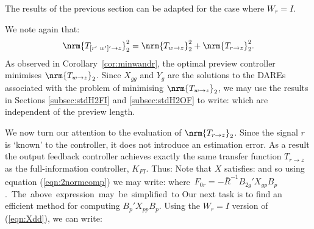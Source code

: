 The results of the previous section can be adapted for the case where $W_r=I$. 

We note again that:
% 
\begin{equation}
\nrm{T_{{[r'\,\,w']'}\rightarrow z}}^2_2 =
\nrm{T_{w\rightarrow z}}^2_2+
\nrm{T_{r\rightarrow z}}^2_2. \label{proj_prop}
\end{equation}
%
As observed in Corollary~\ref{cor:minwandr}, the optimal preview controller minimises $\nrm{T_{w\rightarrow z}}_2$. Since $X_{gg}$ and $Y_g$ are the solutions to the DAREs associated with the problem of minimising $\nrm{T_{w\rightarrow z}}_2$, we may use the results in Sections \ref{subsec:stdH2FI} and \ref{subsec:stdH2OF} to write:
which are independent of the preview length.

We now turn our attention to the evaluation of $\nrm{T_{r\rightarrow z}}_2$. Since the signal $r$ is `known' to the controller, it does not introduce an estimation error. As a result the output feedback controller achieves exactly the same transfer function $T_{r\rightarrow z}$ as the full-information controller, $K_{FI}$. Thus:
%
Note that $X$ satisfies: 
and so using equation (\ref{eqn:2normcomp}) we may write:
\mbox{where $F_{0r}=-{\bar R}^{-1}B_{2g}'X_{gp}B_p$. The above expression may be simplified to} 
%
Our next task is to find an efficient method for computing $B_p'X_{pp}B_p$. Using the $W_r=I$ version of (\ref{eqn:Xdd}), we can write:

